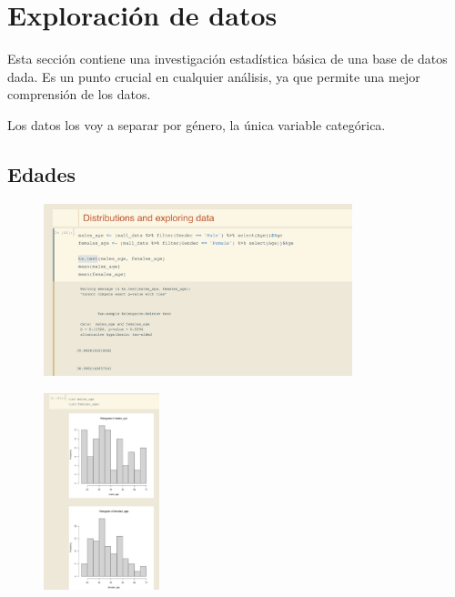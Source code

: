 \documentclass[12pt, fleqn]{report}                             %
\theoremstyle{break}                                            %
\begin{document}
        \clearpage
        \section{Exploración de datos}

            Esta sección contiene una investigación estadística básica de una base de datos dada. 
            Es un punto crucial en cualquier análisis, ya que permite una mejor comprensión de los datos.

            Los datos los voy a separar por género, la única variable categórica.

            \subsection{Edades}

                \begin{figure}[ht!]
                    \centering
                    \includegraphics[width=0.8\textwidth]{4}
                \end{figure}

                \begin{figure}[ht!]
                    \centering
                    \includegraphics[width=0.3\textwidth]{5}
                \end{figure}
\end{document}

